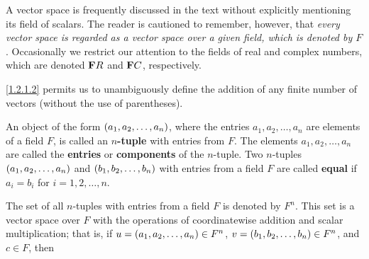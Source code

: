 \begin{note}
    A vector space is frequently discussed in the text without explicitly mentioning its field of scalars.
    The reader is cautioned to remember, however, that \emph{every vector space is regarded as a vector space over a given field, which is denoted by \(F\)}.
    Occasionally we restrict our attention to the fields of real and complex numbers, which are denoted \(\mathbf{F}{R}\) and \(\mathbf{F}{C}\), respectively.
\end{note}

\begin{note}
    \ref{1.2.1.2} permits us to unambiguously define the addition of any finite number of vectors
    (without the use of parentheses).
\end{note}

\begin{defn}\label{1.2.3}
    An object of the form \(\left\lparen a_1, a_2, \dots, a_n\right\rparen\), where the entries \(a_1, a_2, \dots, a_n\) are elements of a field \(F\), is called an \textbf{\(n\)-tuple} with entries from \(F\).
    The elements \(a_1, a_2, \dots, a_n\) are called the \textbf{entries} or \textbf{components} of the \(n\)-tuple.
    Two \(n\)-tuples \(\left\lparen a_1, a_2, \dots, a_n\right\rparen\) and \(\left\lparen b_1, b_2, \dots, b_n\right\rparen\) with entries from a field \(F\) are called \textbf{equal} if \(a_i = b_i\) for \(i = 1, 2, \dots, n\).
\end{defn}

\begin{eg}\label{1.2.4}
    The set of all \(n\)-tuples with entries from a field \(F\) is denoted by \(F^n\).
    This set is a vector space over \(F\) with the operations of coordinatewise addition and scalar multiplication;
    that is, if \(u = \left\lparen a_1, a_2, \dots, a_n\right\rparen \in F^n\), \(v = \left\lparen b_1, b_2, \dots, b_n\right\rparen \in F^n\), and \(c \in F\), then
\end{eg}


